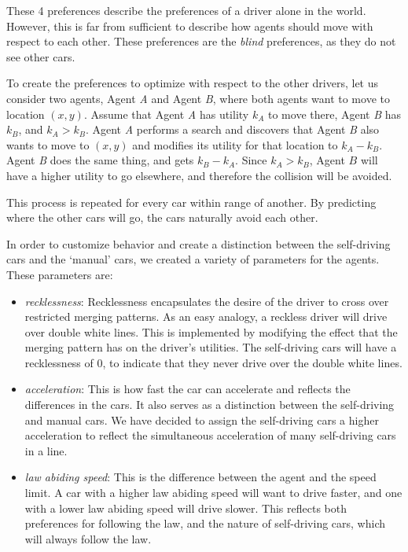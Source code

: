\documentclass[a4paper, 11pt]{article}
\begin{document}
These 4 preferences describe the preferences of a driver alone in the world. However, this is far from sufficient to describe how agents should move with respect to each other. These preferences are the \textit{blind} preferences, as they do not see other cars. 

To create the preferences to optimize with respect to the other drivers, let us consider two agents, Agent \textit{A} and Agent \textit{B}, where both agents want to move to location $(x,y)$. Assume that Agent \textit{A} has utility $k_A$ to move there, Agent \textit{B} has $k_B$, and $k_A > k_B$. Agent \textit{A} performs a search and discovers that Agent \textit{B} also wants to move to $(x,y)$ and modifies its utility for that location to $k_A - k_B$. Agent \textit{B} does the same thing, and gets $k_B - k_A$. Since $k_A > k_B$, Agent $B$ will have a higher utility to go elsewhere, and therefore the collision will be avoided. 

This process is repeated for every car within range of another. By predicting where the other cars will go, the cars naturally avoid each other.%

In order to customize behavior and create a distinction between the self-driving cars and the `manual' cars, we created a variety of parameters for the agents. These parameters are:

\begin{itemize}
\item \textit{recklessness}: Recklessness encapsulates the desire of the driver to cross over restricted merging patterns. As an easy analogy, a reckless driver will drive over double white lines. This is implemented by modifying the effect that the merging pattern has on the driver's utilities. The self-driving cars will have a recklessness of 0, to indicate that they never drive over the double white lines. 
\item \textit{acceleration}: This is how fast the car can accelerate and reflects the differences in the cars. It also serves as a distinction between the self-driving and manual cars. We have decided to assign the self-driving cars a higher acceleration to reflect the simultaneous acceleration of many self-driving cars in a line. 
\item \textit{law abiding speed}: This is the difference between the agent and the speed limit. A car with a higher law abiding speed will want to drive faster, and one with a lower law abiding speed will drive slower. This reflects both preferences for following the law, and the nature of self-driving cars, which will always follow the law. 
\end{itemize}
\end{document}
